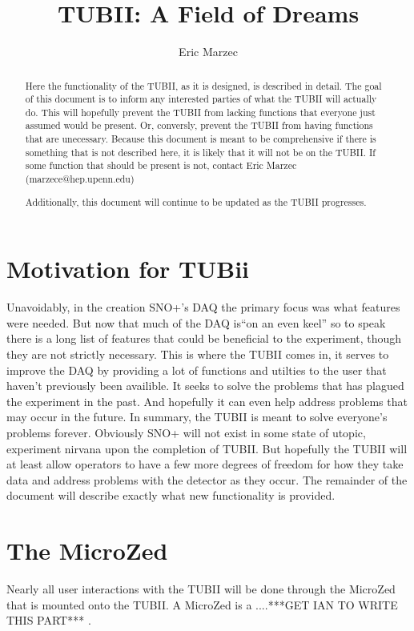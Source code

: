 \documentclass[11pt,a4paper]{article}
\title{TUBII: A Field of Dreams}
\author{Eric Marzec}
\begin{document}
\maketitle
\begin{abstract}
Here the functionality of the TUBII, as it is designed, is described in detail. The goal of this document is to inform any interested parties of what the TUBII will actually do. This will hopefully prevent the TUBII from lacking functions that everyone just assumed would be present. Or, conversly, prevent the TUBII from having functions that are unecessary. Because this document is meant to be comprehensive if there is something that is not described here, it is likely that it will not be on the TUBII. If some function that should be present is not,  contact Eric Marzec (marzece@hep.upenn.edu)

Additionally, this document will continue to be updated as the TUBII progresses.
\end{abstract}
\section{Motivation for TUBii}
Unavoidably, in the creation SNO+'s DAQ the primary focus was what features were needed. But now that much of the DAQ is``on an even keel'' so to speak there is a long list of features that could be beneficial to the experiment, though they are not strictly necessary. This is where the TUBII comes in, it serves to improve the DAQ by providing a lot of functions and utilties to the user that haven't previously been availible. It seeks to solve the problems that has plagued the experiment in the past. And hopefully it can even help address problems that may occur in the future. In summary, the TUBII is meant to solve everyone's problems forever. Obviously SNO+ will not exist in some state of utopic, experiment nirvana upon the completion of TUBII. But hopefully the TUBII will at least allow operators to have a few more degrees of freedom for how they take data and address problems with the detector as they occur. The remainder of the document will describe exactly what new functionality is provided.
\section{The MicroZed}
 Nearly all user interactions with the TUBII will be done through the MicroZed that is mounted onto the TUBII. A MicroZed is a ....***GET IAN TO WRITE THIS PART*** .
\end{document}
